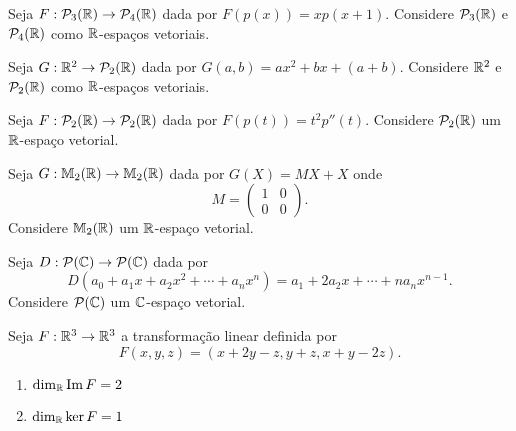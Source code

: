 \documentclass[12pt]{exam}
\begin{document}
\begin{exercicio}
  Seja $F : \mathcal{P}_3(\mathbb{R}) \to \mathcal{P}_4(\mathbb{R})$ dada por $F(p(x)) = xp(x + 1)$. Considere $\mathcal{P}_3(\mathbb{R})$ e $\mathcal{P}_4(\mathbb{R})$ como $\mathbb{R}$-espaços vetoriais.
\end{exercicio}

\begin{exercicio}
  Seja $G : \mathbb{R}^2 \to \mathcal{P}_2(\mathbb{R})$ dada por $G(a,b) = ax^2 + bx + (a + b)$. Considere $\mathbb{R}^2$ e $\mathcal{P}_2(\mathbb{R})$ como $\mathbb{R}$-espaços vetoriais.
\end{exercicio}

\begin{exercicio}
  Seja $F : \mathcal{P}_2(\mathbb{R}) \to \mathcal{P}_2(\mathbb{R})$ dada por $F(p(t)) = t^2p''(t)$. Considere $\mathcal{P}_2(\mathbb{R})$ um $\mathbb{R}$-espaço vetorial.
\end{exercicio}

\begin{exercicio}
  Seja $G : \mathbb{M}_2(\mathbb{R}) \to \mathbb{M}_2(\mathbb{R})$ dada por $G(X) = MX + X$ onde
  \[
      M = \begin{pmatrix}
            1 & 0\\
            0 & 0
          \end{pmatrix}.
  \]
  Considere $\mathbb{M}_2(\mathbb{R})$ um $\mathbb{R}$-espaço vetorial.
\end{exercicio}

\begin{exercicio}
  Seja $D : \mathcal{P}(\mathbb{C}) \to \mathcal{P}(\mathbb{C})$ dada por
  \[
      D(a_0 + a_1x + a_2x^2 + \cdots + a_nx^n) = a_1 + 2a_2x + \cdots + na_nx^{n - 1}.
  \]
  Considere $\mathcal{P}(\mathbb{C})$ um $\mathbb{C}$-espaço vetorial.
\end{exercicio}

\begin{exercicio}
  Seja $F : \mathbb{R}^3 \to \mathbb{R}^3$ a transformação linear definida por
  \[
      F(x,y,z) = (x + 2y - z, y + z, x + y - 2z).
  \]
  \begin{solucao}
    \begin{enumerate}[label={\alph*})]
      \item $\dim_{\mathbb{R}}{\rm Im\,} F = 2$

      \item $\dim_{\mathbb{R}}\ker F = 1$
    \end{enumerate}
  \end{solucao}
\end{exercicio}
\end{document}
